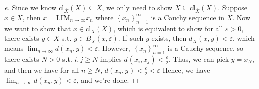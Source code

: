 \begin{proof}[e]
  Since we know \(\mathrm{cl}_{\overline{X}} (X) \subseteq \overline{X} \), we only need to show \(\overline{X} \subseteq \mathrm{cl}_{\overline{X} }(X)  \). Suppose \(x \in \overline{X} \), then \(x = \mathrm{LIM}_{n \to \infty } x_n\) where \(\left\{ x_n \right\}_{n=1}^{\infty}  \) is a Cauchy sequence in \(X\). Now we want to show that \(x \in \mathrm{cl}_{\overline{X} } (X) \), which is equivalent to show for all \(\varepsilon > 0\), there exists \(y \in X\) s.t. \(y \in B_{\overline{X} }(x, \varepsilon )\). If such \(y\) exists, then \(d_{\overline{X} }(x, y)< \varepsilon \), which means \(\lim_{n \to \infty} d(x_n, y) < \varepsilon  \). However, \(\left\{ x_n \right\}_{n=1}^{\infty}  \) is a Cauchy sequence, so there exists \(N > 0\) s.t. \(i, j \ge N\) implies \(d(x_i, x_j) < \frac{\varepsilon}{2}\). Thus, we can pick \(y = x_N\), and then we have for all \(n \ge N\), \(d(x_n, y) < \frac{\varepsilon}{2} < \varepsilon \) Hence, we have \(\lim_{n \to \infty} d(x_n, y) < \varepsilon \), and we're done.              
\end{proof}
